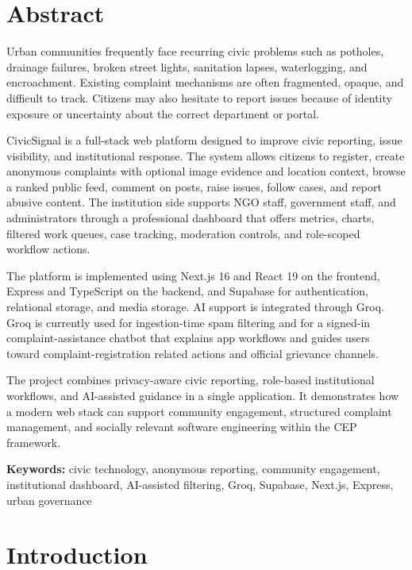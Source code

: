 \documentclass[12pt,a4paper]{report}
\begin{document}
\chapter*{Abstract}
Urban communities frequently face recurring civic problems such as potholes, drainage failures, broken street lights, sanitation lapses, waterlogging, and encroachment. Existing complaint mechanisms are often fragmented, opaque, and difficult to track. Citizens may also hesitate to report issues because of identity exposure or uncertainty about the correct department or portal.

CivicSignal is a full-stack web platform designed to improve civic reporting, issue visibility, and institutional response. The system allows citizens to register, create anonymous complaints with optional image evidence and location context, browse a ranked public feed, comment on posts, raise issues, follow cases, and report abusive content. The institution side supports NGO staff, government staff, and administrators through a professional dashboard that offers metrics, charts, filtered work queues, case tracking, moderation controls, and role-scoped workflow actions.

The platform is implemented using Next.js 16 and React 19 on the frontend, Express and TypeScript on the backend, and Supabase for authentication, relational storage, and media storage. AI support is integrated through Groq. Groq is currently used for ingestion-time spam filtering and for a signed-in complaint-assistance chatbot that explains app workflows and guides users toward complaint-registration related actions and official grievance channels.

The project combines privacy-aware civic reporting, role-based institutional workflows, and AI-assisted guidance in a single application. It demonstrates how a modern web stack can support community engagement, structured complaint management, and socially relevant software engineering within the CEP framework.

\vspace{0.5cm}
\noindent\textbf{Keywords:} civic technology, anonymous reporting, community engagement, institutional dashboard, AI-assisted filtering, Groq, Supabase, Next.js, Express, urban governance

\tableofcontents
\listoffigures
\listoftables

\clearpage
{}

\chapter{Introduction}
\end{document}
